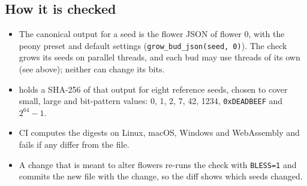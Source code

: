 \subsection{How it is checked}
\begin{itemize}[leftmargin=*]
\item The canonical output for a seed is the flower JSON of flower 0, with
  the peony preset and default settings (\texttt{grow\_bud\_json(seed, 0)}).
  The check grows its seeds on parallel threads, and each bud may use
  threads of its own (see above); neither can change its bits.
\item {} holds a SHA-256 of that output for eight
  reference seeds, chosen to cover small, large and bit-pattern values: 0, 1,
  2, 7, 42, 1234, \texttt{0xDEADBEEF} and $2^{64}-1$.
\item CI computes the digests on Linux, macOS, Windows and WebAssembly and
  fails if any differ from the file.
\item A change that is meant to alter flowers re-runs the check with
  \texttt{BLESS=1} and commits the new file with the change, so the diff shows
  which seeds changed.
\end{itemize}
